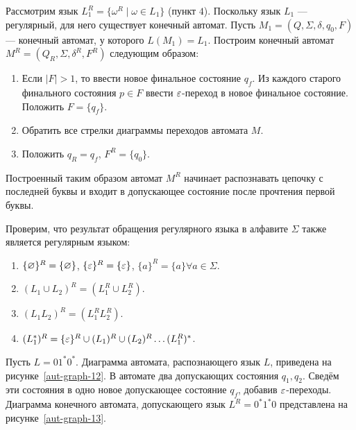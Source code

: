 Рассмотрим язык $L_1^R = \{ \omega^R \mid \omega \in L_1 \}$ (пункт $4$). Поскольку язык $L_1$ --- регулярный, для него существует конечный автомат. Пусть $M_1 = (Q,\Sigma, \delta, q_0, F)$ --- конечный автомат, у которого $L(M_1) = L_1$. Построим конечный автомат $M^R = (Q_R, \Sigma, \delta^R, F^R)$ следующим образом:
\begin{enumerate}
\item Если $\mid F \mid > 1$, то ввести новое финальное состояние $q_f$. Из каждого старого финального состояния $p \in F$ ввести $\varepsilon$-переход в новое финальное состояние. Положить $F = \{ q_f \}$.
\item Обратить все стрелки диаграммы переходов автомата $M$.
\item Положить $q_R = q_f$, $F^R = \{ q_0 \}$.
\end{enumerate}
Построенный таким образом автомат $M^R$ начинает распознавать цепочку с последней буквы и входит в допускающее состояние после прочтения первой буквы.

Проверим, что результат обращения регулярного языка в алфавите $\Sigma$ также является регулярным языком:
\begin{enumerate}
\item $\{ \varnothing \}^R = \{ \varnothing \} $, $\{ \varepsilon \}^R = \{ \varepsilon \} $, $\{ a \}^R = \{ a \} \forall a \in \Sigma $.
\item $(L_1 \cup L_2)^R = (L_{1}^R \cup L_{2}^R)$.
\item $(L_1 L_2)^R = (L_{1}^R L_{2}^R)$.
\item $(L_{1}^*)^R = \{ \varepsilon \}^R \cup (L_1)^R \cup (L_2)^R \ldots (L_{1}^R)^*$.
\end{enumerate}



\begin{myexample}
Пусть $L = 01^*0^*$. Диаграмма автомата, распознающего язык $L$, приведена на рисунке~\ref{aut-graph-12}. В автомате два допускающих состояния $q_1, q_2$. Сведём эти состояния в одно новое допускающее состояние $q_f$, добавив $\varepsilon$-переходы. Диаграмма конечного автомата, допускающего язык $L^R = 0^*1^*0$ представлена на рисунке~\ref{aut-graph-13}.
\end{myexample}

